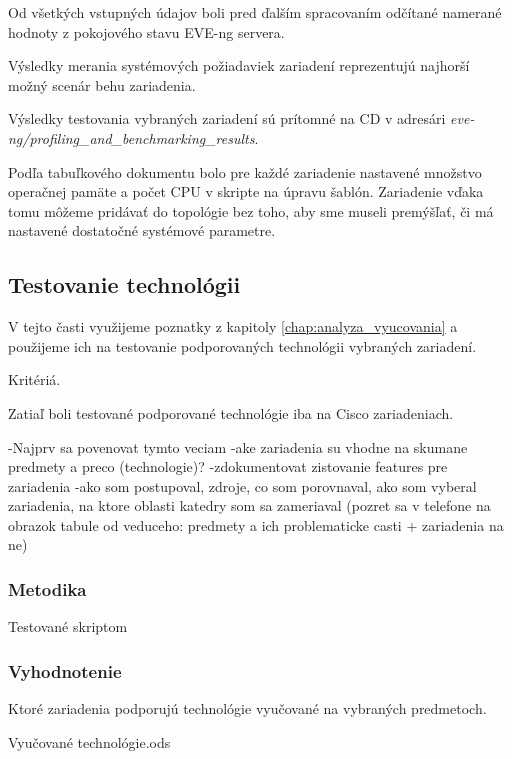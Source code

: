 Od všetkých vstupných údajov boli pred ďalším spracovaním odčítané namerané hodnoty z pokojového stavu EVE-ng servera.

Výsledky merania systémových požiadaviek zariadení reprezentujú najhorší možný scenár behu zariadenia.

Výsledky testovania vybraných zariadení sú prítomné na CD v adresári \emph{eve-ng/profiling\_and\_benchmarking\_results}.

Podľa tabuľkového dokumentu bolo pre každé zariadenie nastavené množstvo operačnej pamäte a počet CPU v skripte na úpravu šablón. Zariadenie vďaka tomu môžeme pridávať do topológie bez toho, aby sme museli premýšľať, či má nastavené dostatočné systémové parametre.




\subsection{Testovanie technológii}
\label{chap:testovanie_technologii}

V tejto časti využijeme poznatky z kapitoly \ref{chap:analyza_vyucovania} a použijeme ich na testovanie podporovaných technológii vybraných zariadení.

Kritériá.

Zatiaľ boli testované podporované technológie iba na Cisco zariadeniach.

-Najprv sa povenovat tymto veciam
      -ake zariadenia su vhodne na skumane predmety a preco (technologie)?
      -zdokumentovat zistovanie features pre zariadenia
        -ako som postupoval, zdroje, co som porovnaval, ako som vyberal zariadenia, na ktore oblasti katedry som sa zameriaval (pozret sa v telefone na obrazok tabule od veduceho: predmety a ich problematicke casti + zariadenia na ne)

\subsubsection{Metodika}

Testované skriptom

\subsubsection{Vyhodnotenie}

Ktoré zariadenia podporujú technológie vyučované na vybraných predmetoch.

Vyučované technológie.ods